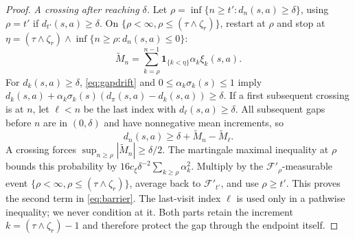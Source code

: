 \begin{proof}
\emph{A crossing after reaching $\delta$.} Let $\rho=\inf\{n\ge t':d_n(s,a)\ge\delta\}$, using $\rho=t'$ if $d_{t'}(s,a)\ge\delta$. On $\{\rho<\infty,\rho\le(\tau\wedge\zeta_r)\}$,
restart at $\rho$ and stop at $\eta=(\tau\wedge\zeta_r)\wedge\inf\{n\ge\rho:d_n(s,a)\le0\}$:
\[
\widetilde M_n=\sum_{k=\rho}^{n-1}\mathbf1_{\{k<\eta\}}\alpha_k\xi_k(s,a).
\]
For $d_k(s,a)\ge\delta$, \eqref{eq:gapdrift} and $0\le\alpha_k\sigma_k(s)\le1$ imply $d_k(s,a)+\alpha_k\sigma_k(s)(d_\pi(s,a)-d_k(s,a))\ge\delta$. If a first subsequent crossing is
at $n$, let $\ell<n$ be the last index with $d_\ell(s,a)\ge\delta$. All subsequent gaps before $n$ are in $(0,\delta)$ and
have nonnegative mean increments, so
\[
d_n(s,a)\ge\delta+\widetilde M_n-\widetilde M_\ell.
\]
A crossing forces $\sup_{n\ge\rho}|\widetilde M_n|\ge\delta/2$. The martingale maximal inequality at $\rho$ bounds this probability by
$16c_\xi\delta^{-2}\sum_{k\ge\rho}\alpha_k^2$. Multiply by the $\mathcal F'_\rho$-measurable event $\{\rho<\infty,\rho\le(\tau\wedge\zeta_r)\}$, average back to $\mathcal F'_{t'}$,
and use $\rho\ge t'$. This proves the second term in \eqref{eq:barrier}. The last-visit index $\ell$ is used only in a pathwise
inequality; we never condition at it. Both parts retain the increment $k=(\tau\wedge\zeta_r)-1$ and therefore
protect the gap through the endpoint itself.
\end{proof}

